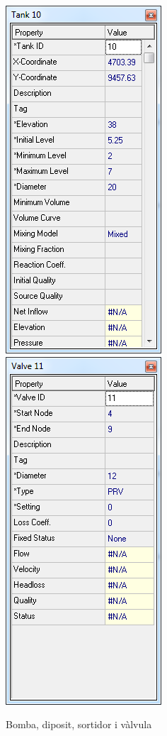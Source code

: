 \documentclass[12pt]{article}
\begin{document}
\begin{figure}[h!]
	\includegraphics[scale=0.35]{imatges/epanet/car/sortidor.png}
	\includegraphics[scale=0.35]{imatges/epanet/car/valvula.png}
	\caption{Bomba, diposit, sortidor i vàlvula}
\end{figure}
\end{document}
